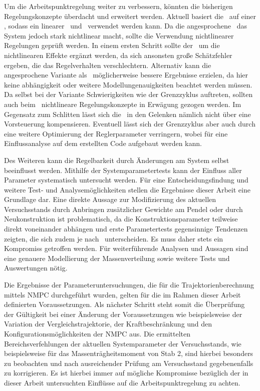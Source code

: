 Um die Arbeitspunktregelung weiter zu verbessern, könnten die bisherigen Regelungskonzepte überdacht und erweitert werden.
Aktuell basiert die \aprg\ auf einer \lin, sodass ein linearer \zsr\ und \beob\ verwendet werden kann.
Da die angesprochene \crb\ das System jedoch stark nichtlinear macht, sollte die Verwendung nichtlinearer Regelungen geprüft werden.
In einem ersten Schritt sollte der \beob\ um die nichtlinearen Effekte ergänzt werden, da sich ansonsten große Schätzfehler ergeben, die das Regelverhalten verschlechtern.
Alternativ kann die angesprochene Variante \emph{\diff} als \ze\ möglicherweise bessere Ergebnisse erzielen, da hier keine \ap abhängigkeit oder weitere Modellungenauigkeiten beachtet werden müssen.
Da selbst bei der Variante \emph{\zm} Schwierigkeiten wie der Grenzzyklus auftreten, sollten auch beim \zsr\ nichtlineare Regelungskonzepte in Erwägung gezogen werden.
Im Gegensatz zum Schlitten lässt sich die \crb\ in den Gelenken nämlich nicht über eine Vorsteuerung kompensieren.
Eventuell lässt sich der Grenzzyklus aber auch durch eine weitere Optimierung der Reglerparameter verringern, wobei für eine Einflussanalyse auf dem erstellten Code aufgebaut werden kann.

Des Weiteren kann die Regelbarkeit durch Änderungen am System selbst beeinflusst werden.
Mithilfe der Systemparametertests kann der Einfluss aller Parameter systematisch untersucht werden.
Für eine Entscheidungsfindung und weitere Test- und Analysemöglichkeiten stellen die Ergebnisse dieser Arbeit eine Grundlage dar.
Eine direkte Aussage zur Modifizierung des aktuellen Versuchsstands durch Anbringen zusätzlicher Gewichte am Pendel oder durch Neukonstruktion  ist problematisch, da die Konstruktionsparameter teilweise direkt voneinander abhängen und erste Parametertests gegensinnige Tendenzen zeigten, die sich zudem je nach \ap\ unterscheiden.
Es muss daher stets ein Kompromiss getroffen werden.
Für weiterführende Analysen und Aussagen sind eine genauere Modellierung der Massenverteilung sowie weitere Tests und Auswertungen nötig.

Die Ergebnisse der Parameteruntersuchungen, die für die Trajektorienberechnung mittels NMPC durchgeführt wurden, gelten für die im Rahmen dieser Arbeit definierten Voraussetzungen. %
Als nächster Schritt steht somit die Überprüfung der Gültigkeit bei einer Änderung der Voraussetzungen wie beispielsweise der Variation der Vergleichstrajektorie, der Kraftbeschränkung und den Konfigurationsmöglichkeiten der NMPC aus. Die ermittelten Bereichsverfehlungen der aktuellen Systemparameter der Versuchsstands, wie beispielsweise für das Massenträgheitsmoment von Stab 2, sind hierbei besonders zu beobachten und nach ausreichender Prüfung am Versuchsstand gegebenenfalls zu korrigieren. Es ist hierbei immer auf mögliche Kompromisse bezüglich der in dieser Arbeit untersuchten Einflüsse auf die Arbeitspunktregelung zu achten.

